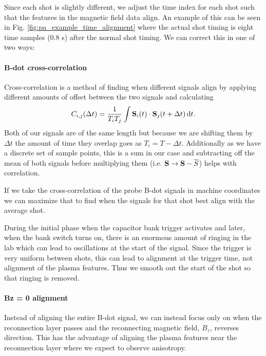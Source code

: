 Since each shot is slightly different, we adjust the time index for each shot such that the features in the magnetic field data align. An example of this can be seen in Fig. \ref{fig:pa_example_time_alignment} where the actual shot timing is eight time samples (0.8 \textmu s) after the normal shot timing. We can correct this in one of two ways:

\paragraph{B-dot cross-correlation}

Cross-correlation is a method of finding when different signals align by applying different amounts of offset between the two signals and calculating
\begin{equation}
    C_{i,j}(\Delta t) = \frac{1}{T_i T_j} \int \vb{S}_i(t) \cdot \vb{S}_j(t + \Delta t) \, \dd t.
\end{equation}
Both of our signals are of the same length but because we are shifting them by $\Delta t$ the amount of time they overlap goes as $T_i = T - \Delta t$. Additionally as we have a discrete set of sample points, this is a sum in our case and subtracting off the mean of both signals before multiplying them (i.e. $\vb{S} \rightarrow \vb{S} - \overline{S}$) helps with correlation.

If we take the cross-correlation of the probe B-dot signals in machine coordinates we can maximize that to find when the signals for that shot best align with the average shot.

During the initial phase when the capacitor bank trigger activates and later, when the bank switch turns on, there is an enormous amount of ringing in the lab which can lead to oscillations at the start of the signal. Since the trigger is very uniform between shots, this can lead to alignment at the trigger time, not alignment of the plasma features. Thus we smooth out the start of the shot so that ringing is removed.

\paragraph{Bz = 0 alignment}

Instead of aligning the entire B-dot signal, we can instead focus only on when the reconnection layer passes and the reconnecting magnetic field, $B_z$, reverses direction. This has the advantage of aligning the plasma features near the reconnection layer where we expect to observe anisotropy.

